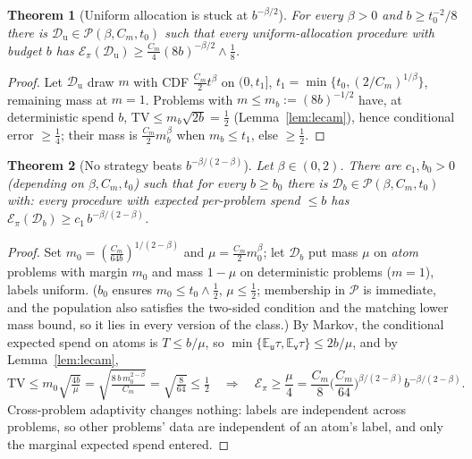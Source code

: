 \documentclass[11pt]{article}
\newtheorem{theorem}{Theorem}
\newcommand{\D}{\mathcal D}
\newcommand{\E}{\mathbb E}
\newcommand{\TV}{\mathrm{TV}}
\newcommand{\class}{\mathcal P}
\begin{document}
\begin{theorem}[Uniform allocation is stuck at $b^{-\beta/2}$]
\label{thm:lower-uniform}
For every $\beta>0$ and $b\ge t_0^{-2}/8$ there is
$\D_{\mathrm u}\in\class(\beta,C_m,t_0)$ such that every uniform-allocation
procedure with budget $b$ has
$\mathcal E_\pi(\D_{\mathrm u})\ge\frac{C_m}{4}(8b)^{-\beta/2}\wedge\frac18$.
\end{theorem}

\begin{proof}
Let $\D_{\mathrm u}$ draw $m$ with CDF $\frac{C_m}{2}t^\beta$ on
$(0,t_1]$, $t_1=\min\{t_0,(2/C_m)^{1/\beta}\}$, remaining mass at $m=1$.
Problems with $m\le m_b:=(8b)^{-1/2}$ have, at deterministic spend $b$,
$\TV\le m_b\sqrt{2b}=\frac12$ (Lemma~\ref{lem:lecam}), hence conditional
error $\ge\frac14$; their mass is $\frac{C_m}{2}m_b^\beta$ when $m_b\le
t_1$, else $\ge\frac12$.
\end{proof}

\begin{theorem}[No strategy beats $b^{-\beta/(2-\beta)}$]
\label{thm:lower-adaptive}
Let $\beta\in(0,2)$.  There are $c_1,b_0>0$ (depending on
$\beta,C_m,t_0$) such that for every $b\ge b_0$ there is
$\D_b\in\class(\beta,C_m,t_0)$ with: every procedure with expected
per-problem spend $\le b$ has
$\mathcal E_\pi(\D_b)\ge c_1\,b^{-\beta/(2-\beta)}$.
\end{theorem}

\begin{proof}
Set $m_0=(\frac{C_m}{64b})^{1/(2-\beta)}$ and $\mu=\frac{C_m}{2}m_0^\beta$;
let $\D_b$ put mass $\mu$ on \emph{atom} problems with margin $m_0$ and
mass $1-\mu$ on deterministic problems ($m=1$), labels uniform.  ($b_0$
ensures $m_0\le t_0\wedge\frac12$, $\mu\le\frac12$; membership in $\class$
is immediate, and the population also satisfies the two-sided condition and
the matching lower mass bound, so it lies in every version of the class.)
By Markov, the conditional expected spend on atoms is $T\le b/\mu$, so
$\min\{\E_{\mathsf u}\tau,\E_{\mathsf v}\tau\}\le2b/\mu$, and by
Lemma~\ref{lem:lecam},
\[
\TV\le m_0\sqrt{\tfrac{4b}{\mu}}
=\sqrt{\tfrac{8\,b\,m_0^{2-\beta}}{C_m}}
=\sqrt{\tfrac{8}{64}}\le\tfrac12
\quad\Longrightarrow\quad
\mathcal E_\pi\ge\frac\mu4=\frac{C_m}{8}
\Big(\frac{C_m}{64}\Big)^{\beta/(2-\beta)}b^{-\beta/(2-\beta)} .
\]
Cross-problem adaptivity changes nothing: labels are independent across
problems, so other problems' data are independent of an atom's label, and
only the marginal expected spend entered.
\end{proof}
\end{document}
